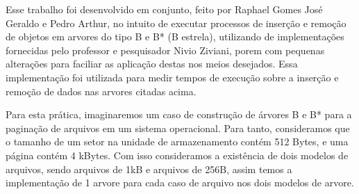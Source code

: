 \label{Introdução}

Esse trabalho foi desenvolvido em conjunto, feito por Raphael Gomes José Geraldo e Pedro Arthur, no intuito de executar processos de inserção e remoção de objetos em arvores do tipo B e B* (B estrela), utilizando de implementações fornecidas pelo professor e pesquisador Nivio Ziviani, porem com pequenas alterações para faciliar as aplicação destas nos meios desejados. Essa implementação foi utilizada para medir tempos de execução sobre a inserção e remoção de dados nas arvores citadas acima. 

Para esta prática, imaginaremos um caso de construção de árvores B e B* para a paginação de arquivos em um sistema operacional. Para tanto, consideramos que o tamanho de um setor na unidade de armazenamento contém 512 Bytes, e uma
página contém 4 kBytes. Com isso consideramos a existência de dois modelos de arquivos, sendo arquivos de 1kB e arquivos de 256B, assim temos a implementação de 1 arvore para cada caso de arquivo nos dois modelos de arvore.

